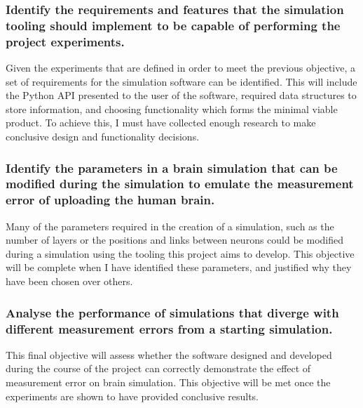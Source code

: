 \subsubsection{Identify the requirements and features that the simulation
      tooling should implement to be capable of performing the project experiments.}

Given the experiments that are defined in order to meet the previous objective,
a set of requirements for the simulation software can be identified. This will
include the Python API presented to the user of the software, required data
structures to store information, and choosing functionality which forms the
minimal viable product. To achieve this, I must have collected enough research
to make conclusive design and functionality decisions.


\subsubsection{Identify
      the parameters in a brain simulation that can be modified during the simulation
      to emulate the measurement error of uploading the human brain.}

Many of the parameters required in the creation of a simulation, such as the
number of layers or the positions and links between neurons could be modified
during a simulation using the tooling this project aims to develop. This
objective will be complete when I have identified these parameters, and
justified why they have been chosen over others.


\subsubsection{Analyse the performance of simulations
      that diverge with different measurement errors from a starting simulation.}

This final objective will assess whether the software designed and developed
during the course of the project can correctly demonstrate the effect of
measurement error on brain simulation. This objective will be met once the
experiments are shown to have provided conclusive results.

\pagebreak



